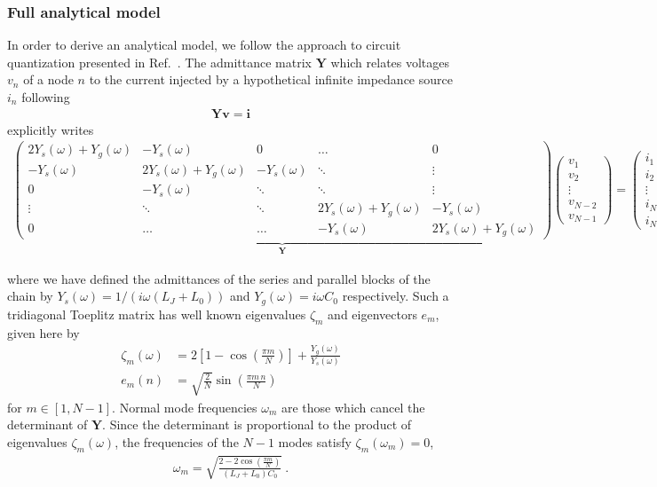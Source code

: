 \subsubsection{Full analytical model}\label{sec:analytical}

In order to derive an analytical model, we follow the approach to circuit quantization presented in Ref.~\cite{gelyQuCATQuantumCircuit2019}.
%
The admittance matrix $\mathbf{Y}$ which relates voltages $v_n$ of a node $n$ to the current injected by a hypothetical infinite impedance source $i_n$ following 
\begin{align}
\mathbf{Y}\mathbf{v} = \mathbf{i}
\label{eq:v_to_i_relation}
\end{align}
explicitly writes
\begin{align}
\underbrace{\begin{pmatrix} 
	2Y_s(\omega)+Y_g (\omega) & - Y_s(\omega) & 0 & \dots & 0 \\
	- Y_s(\omega) & 2Y_s(\omega)+Y_g (\omega) & - Y_s(\omega) & \ddots & \vdots \\
	0 & - Y_s(\omega) & \ddots & \ddots & \vdots  \\
	\vdots & \ddots & \ddots & 2Y_s(\omega)+Y_g (\omega) &- Y_s(\omega) \\
	0 & \dots & \dots & -Y_s(\omega) & 2Y_s(\omega)+Y_g (\omega)
	\end{pmatrix}}_{\mathbf{Y}}
\begin{pmatrix}
v_{1} \\
v_{2} \\
\vdots \\
v_{N-2} \\
v_{N-1}
\end{pmatrix}
=
\begin{pmatrix}
i_{1} \\
i_{2} \\
\vdots \\
i_{N-2} \\
i_{N-1}
\end{pmatrix}
\label{eq:admittance_matrix}
\end{align}

where we have defined the admittances of the series and parallel blocks of the chain by $Y_s(\omega)  = 1/(i \omega (L_J+L_0))$ and $Y_g(\omega)  = i \omega C_0$ respectively.
%
Such a tridiagonal Toeplitz matrix \cite{noscheseTridiagonalToeplitzMatrices2013} has well known eigenvalues $\zeta_m$ and eigenvectors $e_m$, given here by
\begin{align}
\zeta_m(\omega) &=  2 \left[ 1 - \cos \left(\frac{\pi m}{N}\right) \right] + \frac{Y_g(\omega)}{Y_s (\omega)} \\
e_{m}(n) &= \sqrt{\frac{2}{N}} \sin\left(\frac{\pi m \, n}{N}\right)
\end{align}
for $m\in[1,N-1]$.
%
Normal mode frequencies $\omega_m$ are those which cancel the determinant of $\textbf{Y}$.
%
Since the determinant is proportional to the product of eigenvalues $\zeta_m(\omega)$, the frequencies of the $N-1$ modes satisfy $\zeta_m(\omega_m) = 0$,
\begin{align}
\omega_m = \sqrt{\frac{2-2\cos\left(\frac{\pi m}{N}\right)}{(L_J+L_0)C_0}}\ .
\label{eq:anh-wm}
\end{align}


